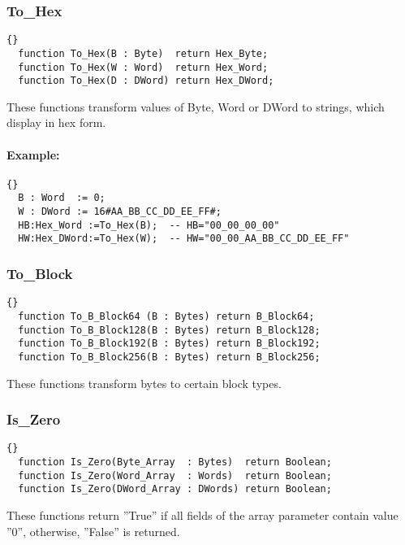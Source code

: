 \hhline
\subsubsection*{To\_Hex}
\begin{lstlisting}{}
  function To_Hex(B : Byte)  return Hex_Byte;
  function To_Hex(W : Word)  return Hex_Word;
  function To_Hex(D : DWord) return Hex_DWord;
\end{lstlisting}
These functions transform values of Byte, Word or DWord to strings,
which display in hex form.

\paragraph{Example:}
\begin{lstlisting}{}
  B : Word  := 0;
  W : DWord := 16#AA_BB_CC_DD_EE_FF#;
  HB:Hex_Word :=To_Hex(B);  -- HB="00_00_00_00"
  HW:Hex_DWord:=To_Hex(W);  -- HW="00_00_AA_BB_CC_DD_EE_FF"
\end{lstlisting}

\hhline
\subsubsection*{To\_Block}
\begin{lstlisting}{}
  function To_B_Block64 (B : Bytes) return B_Block64;
  function To_B_Block128(B : Bytes) return B_Block128;
  function To_B_Block192(B : Bytes) return B_Block192;
  function To_B_Block256(B : Bytes) return B_Block256;
\end{lstlisting}
These functions transform bytes to certain block types.

\hhline
\subsubsection{Is\_Zero}
\begin{lstlisting}{}
  function Is_Zero(Byte_Array  : Bytes)  return Boolean;
  function Is_Zero(Word_Array  : Words)  return Boolean;
  function Is_Zero(DWord_Array : DWords) return Boolean;
\end{lstlisting}
These functions return ''True'' if all fields of the array parameter
contain value ''0'', otherwise, ''False'' is returned.

\hhline
